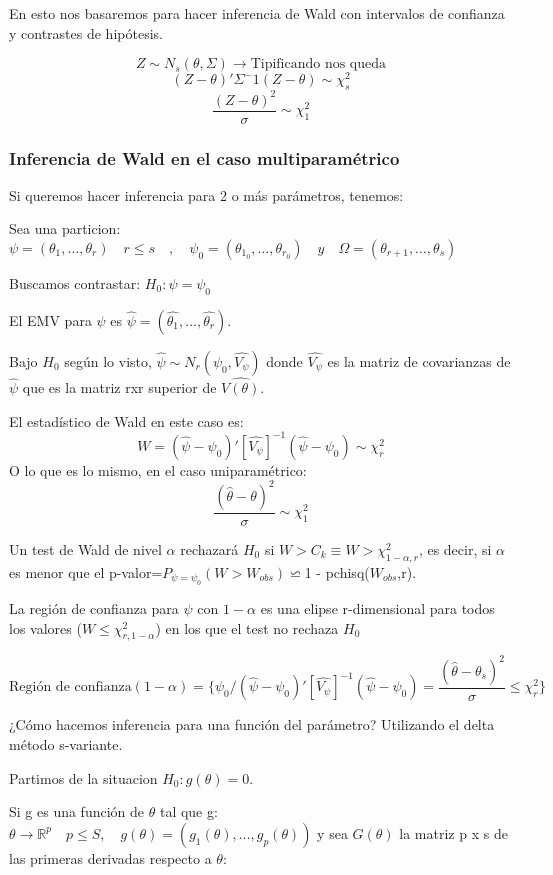 En esto nos basaremos para hacer inferencia de Wald con intervalos de confianza y contrastes de hipótesis.

\[
Z \sim N_s(\theta,\Sigma) \to \text{Tipificando nos queda}
\]
\[
(Z-\theta)' \Sigma^-1 (Z-\theta) \sim \chi_s^2
\]
\[
\frac{(Z-\theta)^2}{\sigma} \sim \chi^2_1
\]

\subsubsection{Inferencia de Wald en el caso multiparamétrico}

Si queremos hacer inferencia para 2 o más parámetros, tenemos:

Sea una particion:
\(
\psi=(\theta_1,\dots,\theta_r) \quad r \leq s \quad, \quad
\psi_0=(\theta_{1_0},\dots,\theta_{r_0}) \quad y \quad 
\Omega=(\theta_{r+1},\dots,\theta_s)
\)

Buscamos contrastar: $H_0:\psi=\psi_0$

El EMV para $\psi$ es $\widehat{\psi}=(\widehat{\theta_1},\dots,\widehat{\theta_r})$.

Bajo $H_0$ según lo visto, $\widehat{\psi}\sim N_r(\psi_0,\widehat{V_\psi})$
donde $\widehat{V_\psi}$ es la matriz de covarianzas de $\widehat{\psi}$ que es la matriz rxr superior de $\widehat{V(\theta)}$.

El estadístico de Wald en este caso es:
\[
W=(\widehat{\psi}-\psi_0)'[\widehat{V_\psi}]^{-1}(\widehat{\psi}-\psi_0)\sim\chi^2_r
\]
O lo que es lo mismo, en el caso uniparamétrico:
\[
\frac{(\widehat{\theta}-\theta)^2}{\sigma}\sim \chi^2_1
\]

Un test de Wald de nivel $\alpha$ rechazará $H_0$ si $W>C_k\equiv W>\chi^2_{1-\alpha,r}$, es decir, si
$\alpha$ es menor que el p-valor=$P_{\psi=\psi_0}(W>W_{obs})\backsimeq$1 - pchisq($W_{obs}$,r).

La región de confianza para $\psi$ con $1-\alpha$ es una elipse r-dimensional para todos los valores ($W \leq \chi^2_{r,1-\alpha}$) en los que el test no rechaza $H_0$

\[
\text{Región de confianza}(1-\alpha)=\{ \psi_0 /(\widehat{\psi}-\psi_0)'[\widehat{V_\psi}]^{-1}(\widehat{\psi}-\psi_0)=\frac{(\widehat{\theta}-\theta_s)^2}{\sigma}\leq\chi^2_r\}
\]

¿Cómo hacemos inferencia para una función del parámetro?
Utilizando el delta método s-variante.

Partimos de la situacion $H_0:g(\theta)=0$.

Si g es una función de $\theta$ tal que g:$\theta \to \mathbb{R}^p \quad p \leq S, \quad g(\theta)=(g_1(\theta),\dots,g_p(\theta))$
y sea $G(\theta)$ la matriz p x s de las primeras derivadas respecto a $\theta$:

